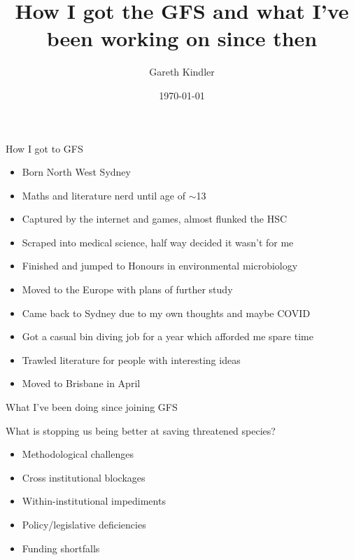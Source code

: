 \documentclass{beamer}
\title{How I got the GFS and what I've been working on since then}
\author{Gareth Kindler}
\date{\today}
\begin{document}
\begin{frame}{How I got to GFS} %
\begin{itemize}
    \item<1-> Born North West Sydney
    \item<2-> Maths and literature nerd until age of $\sim$13
    \item<2-> Captured by the internet and games, almost flunked the HSC
    \item<3-> Scraped into medical science, half way decided it wasn't for me
    \item<3-> Finished and jumped to Honours in environmental microbiology
    \item<3-> Moved to the Europe with plans of further study
    \item<4-> Came back to Sydney due to my own thoughts and maybe COVID
    \item<4-> Got a casual bin diving job for a year which afforded me spare time
    \item<4-> Trawled literature for people with interesting ideas
    \item<4-> Moved to Brisbane in April
\end{itemize}
\end{frame}

\begin{frame}{What I've been doing since joining GFS}
\end{frame}

\begin{frame}{What is stopping us being better at saving threatened species?}
\begin{itemize}
    \item<2-> Methodological challenges
    \item<2-> Cross institutional blockages
    \item<2-> Within-institutional impediments
    \item<2-> Policy/legislative deficiencies
    \item<2-> Funding shortfalls
\\
\footnotesize{}
\end{itemize}
\end{frame}
\end{document}
